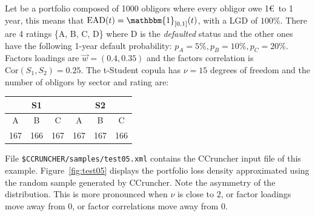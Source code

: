 \documentclass[11pt,fleqn]{book} %
\begin{document}
\begin{example}[2 factors]
	\label{ex:test05}
	Let be a portfolio composed of 1000 obligors where every obligor owe 1\euro\ to
	1 year, this means that $\text{EAD}(t) = \mathbbm{1}_{[0,1]}(t)$, with 
	a LGD of $100\%$. There are 4 ratings \{A, B, C, D\} where D is the 
	\emph{defaulted} status and the other ones have the following 1-year default 
	probability: $p_A = 5\%, p_B = 10\%, p_C = 20\%$. Factors loadings are 
	$\vec{w} = (0.4, 0.35)$ and the factors correlation is 
	$\text{Cor}(S_1,S_2) = 0.25$. The t-Student copula has $\nu=15$ degrees
	of freedom and the number of obligors by sector and rating are:

	\hspace*{1cm}
	\begin{tabular}{|c|c|c||c|c|c|}
		\hline
		\multicolumn{3}{|c||}{S1} & \multicolumn{3}{|c|}{S2} \\
		\hline
		A & B & C & A & B & C \\
		\hline
		167 & 166 & 167 & 167 & 167 & 166 \\
		\hline
	\end{tabular}
	

	File \texttt{\$CCRUNCHER/samples/test05.xml} contains the CCruncher input
	file of this example. Figure~\ref{fig:test05} displays the portfolio
	loss density approximated using the random sample generated by CCruncher.
	Note the asymmetry of the distribution. This is more pronounced when 
	$\nu$ is close to $2$, or factor loadings move away from $0$, or factor 
	correlations move away from $0$.


\end{example}
\end{document}
